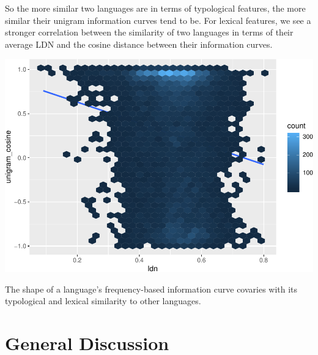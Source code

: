 \documentclass[11pt,]{article}
\newenvironment{Shaded}{\begin{snugshade}}{\end{snugshade}}
\newcommand{\DataTypeTok}[1]{\textcolor[rgb]{0.13,0.29,0.53}{#1}}
\newcommand{\FloatTok}[1]{\textcolor[rgb]{0.00,0.00,0.81}{#1}}
\newcommand{\KeywordTok}[1]{\textcolor[rgb]{0.13,0.29,0.53}{\textbf{#1}}}
\newcommand{\NormalTok}[1]{#1}
\newcommand{\OperatorTok}[1]{\textcolor[rgb]{0.81,0.36,0.00}{\textbf{#1}}}
\newcommand{\StringTok}[1]{\textcolor[rgb]{0.31,0.60,0.02}{#1}}
\begin{document}
So the more similar two languages are in terms of typological features, the more similar their unigram information curves tend to be. For lexical features, we see a stronger correlation between the similarity of two languages in terms of their average LDN and the cosine distance between their information curves.

\begin{Shaded}
\end{Shaded}

\includegraphics{paper_files/figure-latex/ldn features vs cosine similarity-1.pdf}

The shape of a language's frequency-based information curve covaries with its typological and lexical similarity to other languages.

\hypertarget{general-discussion}{%
\section{General Discussion}\label{general-discussion}}
\end{document}
